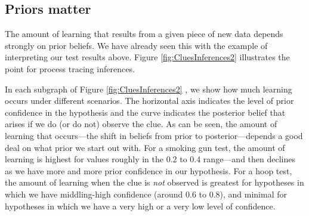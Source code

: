 \documentclass[
  12pt,
]{book}
\begin{document}
\hypertarget{AppPriors}{%
\subsection{Priors matter}\label{AppPriors}}

The amount of learning that results from a given piece of new data depends strongly on prior beliefs. We have already seen this with the example of interpreting our test results above. Figure \ref{fig:CluesInferences2} illustrates the point for process tracing inferences.

In each subgraph of Figure \ref{fig:CluesInferences2} , we show how much learning occurs under different scenarios. The horizontal axis indicates the level of prior confidence in the hypothesis and the curve indicates the posterior belief that arises if we do (or do not) observe the clue. As can be seen, the amount of learning that occurs---the shift in beliefs from prior to posterior---depends a good deal on what prior we start out with. For a smoking gun test, the amount of learning is highest for values roughly in the 0.2 to 0.4 range---and then declines as we have more and more prior confidence in our hypothesis. For a hoop test, the amount of learning when the clue is \emph{not} observed is greatest for hypotheses in which we have middling-high confidence (around 0.6 to 0.8), and minimal for hypotheses in which we have a very high or a very low level of confidence.
\end{document}
